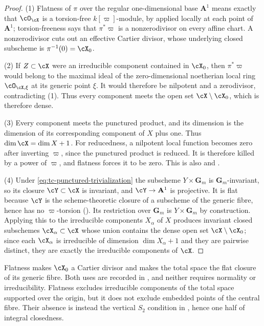 \begin{proof}
(1)  Flatness of $\pi$ over the regular one-dimensional base
$\mathbf A^1$ means exactly that $\cO_{\cX}$ is a torsion-free
$k[\varpi]$-module, by  applied
locally at each point of $\mathbf A^1$; torsion-freeness says that
$\pi^\ast\varpi$ is a nonzerodivisor on every affine chart.  A
nonzerodivisor cuts out an effective Cartier divisor, whose underlying
closed subscheme is $\pi^{-1}(0)=\cX_0$.

(2)  If $Z\subset\cX$ were an irreducible component contained in
$\cX_0$, then $\pi^\ast\varpi$ would belong to the maximal ideal
of the zero-dimensional noetherian local ring $\cO_{\cX,\xi}$ at its
generic point $\xi$.  It would therefore be nilpotent and a zerodivisor,
contradicting (1).  Thus every component meets the open set
$\cX\setminus\cX_0$, which is therefore dense.

(3)  Every component meets the punctured product, and its dimension is
the dimension of its corresponding component of $X$ plus one.
Thus $\dim\cX=\dim X+1$.  For reducedness, a nilpotent local function
becomes zero after inverting $\varpi$, since the punctured product is
reduced.  It is therefore killed by a power of $\varpi$, and flatness
forces it to be zero.  This is also
\cite[Proposition~2.6]{BHJ17} and \cite[\S1.2]{BJ22}.

(4)  Under \eqref{eq:tc-punctured-trivialization} the subscheme
$Y\times\mathbf G_m$ is $\mathbf G_m$-invariant, so its closure
$\cY\subset\cX$ is invariant, and $\cY\to\mathbf A^1$ is projective.
It is flat because $\cY$ is the scheme-theoretic closure of a subscheme
of the generic fibre, hence has no $\varpi$-torsion
().  Its restriction over
$\mathbf G_m$ is $Y\times\mathbf G_m$ by construction.  Applying this to
the irreducible components $X_\alpha$ of $X$ produces invariant closed
subschemes $\cX_\alpha\subset\cX$ whose union contains the dense open set
$\cX\setminus\cX_0$; since each $\cX_\alpha$ is irreducible of
dimension $\dim X_\alpha+1$ and they are pairwise distinct, they are
exactly the irreducible components of $\cX$.
\end{proof}

\begin{remark}
\label{rem:ch33-flatness-role}
Flatness makes $\cX_0$ a Cartier divisor and makes the total space the
flat closure of its generic fibre.  Both uses are
recorded in , and neither requires
normality or irreducibility.  Flatness excludes irreducible components of
the total space supported over the origin, but it does not exclude embedded
points of the central fibre.  Their absence is instead the vertical
$S_2$ condition in
, hence one half of integral
closedness.
\end{remark}

